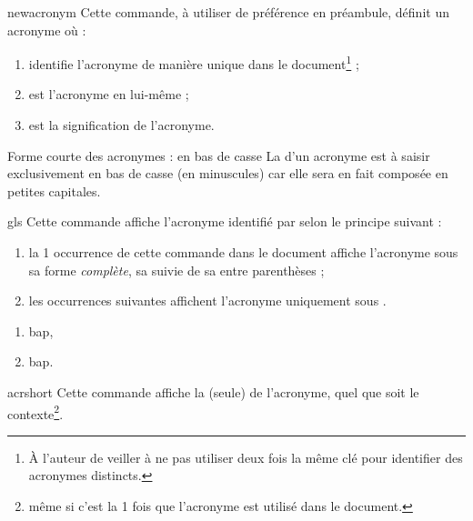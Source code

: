 \begin{docCommand}{newacronym}{}
  Cette commande, à utiliser de préférence en préambule, définit un acronyme
  où :
  \begin{enumerate}
  \item {} identifie l'acronyme de manière unique dans le
    document\footnote{À l'auteur de veiller à ne pas utiliser deux fois la même
      clé pour identifier des acronymes distincts.} ;
  \item {} est l'acronyme en lui-même ;
  \item {} est la signification de l'acronyme.
  \end{enumerate}
\begin{dbwarning}{Forme courte des acronymes : en bas de casse}{}
  La  d'un acronyme est à saisir exclusivement en bas de
  casse (en minuscules) car elle sera en fait composée en petites capitales.
\end{dbwarning}
\end{docCommand}

\begin{docCommand}{gls}{}
  Cette commande affiche l'acronyme identifié par  selon le principe
  suivant :
  \begin{enumerate}
  \item la 1\iere{} occurrence de cette commande dans le document affiche
    l'acronyme sous sa forme \emph{complète}, \ie*{} sa 
    suivie de sa  entre parenthèses ;
  \item les occurrences suivantes affichent l'acronyme uniquement sous
    .
  \end{enumerate}
\end{docCommand}

\begin{preamblecode}
\end{preamblecode}
\begin{bodycode}
\begin{enumerate}
\item \gls{bap},
\item \gls{bap}.
\end{enumerate}
\end{bodycode}

\begin{docCommand}{acrshort}{}
  Cette commande affiche la  (seule) de l'acronyme, quel que
  soit le contexte\footnote{\Ie*{} même si c'est la 1\iere{} fois que l'acronyme
    est utilisé dans le document.}.
\end{docCommand}

